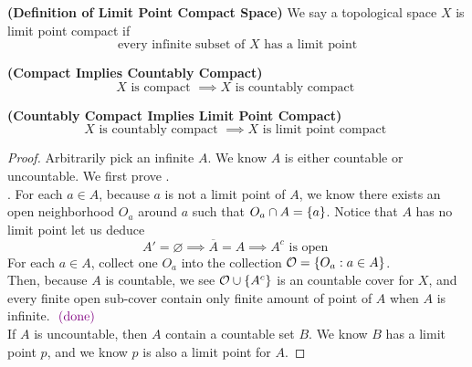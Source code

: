 \documentclass{report}
\begin{document}
\begin{definition}
\label{0.3.9}
\textbf{(Definition of Limit Point Compact Space)} We say a topological space $X$ is limit point compact if 
\begin{equation}
\text{every infinite subset of $X$ has a limit point}
\end{equation}
\end{definition}
\begin{theorem}
\label{0.3.10}
\textbf{(Compact Implies Countably Compact)} 
\begin{equation}
 X\text{ is compact }\implies X\text{ is countably compact }
\end{equation}
\end{theorem}
\begin{theorem}
\label{0.3.11}
\textbf{(Countably Compact Implies Limit Point Compact)} 
\begin{equation}
X\text{ is countably compact }\implies X\text{ is limit point compact }
\end{equation}
\end{theorem}
\begin{proof}
Arbitrarily pick an infinite $A$. We know  $A$ is either countable or uncountable. We first prove  .\\

. For each $a\in A$, because $a$ is not a limit point of $A$, we know there exists an open neighborhood  $O_a$ around $a$ such that  $O_a\cap A=\{ a \}$. Notice that $A$ has no limit point let us deduce
\begin{equation}
A'=\varnothing \implies \overline{A}=A\implies A^c\text{ is open }
\end{equation}
For each $a\in A$, collect one $O_a$ into the collection $\mathcal{O}=\{ O_a:a\in A \}$.\\

Then, because $A$ is countable, we see $\mathcal{O}\cup \{ A^c \}$ is an countable cover for $X$, and every finite open sub-cover contain only finite amount of point of $A$ when  $A$ is infinite. \CaC $\textcolor{violet}{\text{ (done) }}$\\

If $A$ is uncountable, then  $A$ contain a countable set  $B$. We know  $B$ has a limit point  $p$, and we know  $p$ is also a limit point for $A$.
\end{proof}
\end{document}
